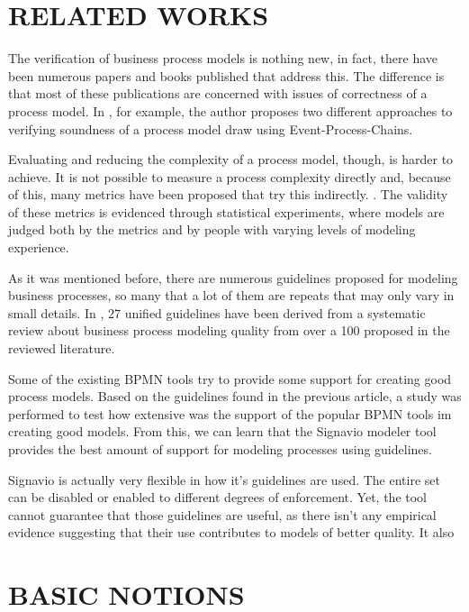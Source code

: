 \documentclass[a4paper,twoside]{article}
\begin{document}
\section{RELATED WORKS}\label{RelatedWorks}


The verification of business process models is nothing new, in fact, there have been numerous papers and books published that address this. The difference is that most of these publications are concerned with issues of correctness of a process model. In \cite{Mendling2008}, for example, the author proposes two different approaches to verifying soundness of a process model draw using Event-Process-Chains.
	
Evaluating and reducing the complexity of a process model, though, is harder to achieve. It is not possible to measure a process complexity directly and, because of this, many metrics have been proposed that try this indirectly. \cite{?}. The validity of these metrics is evidenced through statistical experiments, where models are judged both by the metrics and by people with varying levels of modeling experience.

As it was mentioned before, there are numerous guidelines proposed for modeling business processes, so many that a lot of them are repeats that may only vary in small details. In \cite{Moreno-MontesdeOca2014}, 27 unified guidelines have been derived from a systematic review about business process modeling quality from over a 100 proposed in the reviewed literature. 

Some of the existing BPMN tools try to provide some support for creating good process models. Based on the guidelines found in the previous article, a study \cite{MoniqueSnoeckIsel2015} was performed to test how extensive was the support of the popular BPMN tools im creating good models. From this, we can learn that the Signavio modeler tool provides the best amount of support for modeling processes using guidelines. 

Signavio is actually very flexible in how it's guidelines are used. The entire set can be disabled or enabled to different degrees of enforcement. Yet, the tool cannot guarantee that those guidelines are useful, as there isn't any empirical evidence suggesting that their use contributes to models of better quality. It also 

\section{BASIC NOTIONS}\label{Fundamentals}\label{Background}
\end{document}
